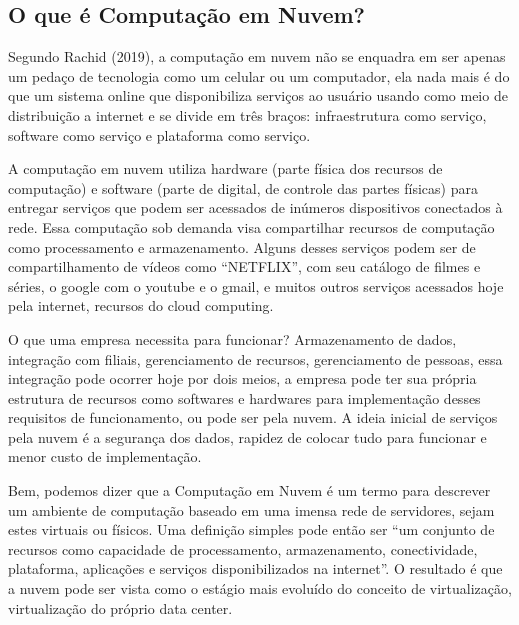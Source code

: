 \begin{justify}
    \section{O que é Computação em Nuvem?}
    Segundo Rachid (2019), a computação em nuvem não se enquadra em ser apenas um
    pedaço de tecnologia como um celular ou um computador, ela nada mais é do que um
    sistema online que disponibiliza serviços ao usuário usando como meio de distribuição a
    internet e se divide em três braços: infraestrutura como serviço, software como serviço e
    plataforma como serviço.

    A computação em nuvem utiliza hardware (parte física dos recursos de computação) e
    software (parte de digital, de controle das partes físicas) para entregar serviços que podem
    ser acessados de inúmeros dispositivos conectados à rede. Essa computação sob demanda
    visa compartilhar recursos de computação como processamento e armazenamento.
    Alguns desses serviços podem ser de compartilhamento de vídeos como
    “NETFLIX”, com seu catálogo de filmes e séries, o google com o youtube e o gmail, e
    muitos outros serviços acessados hoje pela internet, recursos do cloud computing.

    O que uma empresa necessita para funcionar? Armazenamento de dados, integração com
    filiais, gerenciamento de recursos, gerenciamento de pessoas, essa integração pode ocorrer
    hoje por dois meios, a empresa pode ter sua própria estrutura de recursos como softwares e
    hardwares para implementação desses requisitos de funcionamento, ou pode ser pela
    nuvem. A ideia inicial de serviços pela nuvem é a segurança dos dados, rapidez de colocar
    tudo para funcionar e menor custo de implementação.

    \vspace{0.2cm}
    \begin{flushright}
        \begin{minipage}{.7\textwidth}
            \noindent
            \footnotesize

            \begin{justify}
            Bem, podemos dizer que a Computação em Nuvem é um termo para descrever um
            ambiente de computação baseado em uma imensa rede de servidores, sejam estes
            virtuais ou físicos. Uma definição simples pode então ser “um conjunto de recursos
            como capacidade de processamento, armazenamento, conectividade, plataforma,
            aplicações e serviços disponibilizados na internet”. O resultado é que a nuvem pode
            ser vista como o estágio mais evoluído do conceito de virtualização, virtualização do
            próprio data center. \cite{taurion2009cloud}
            \end{justify}
        \end{minipage}
    \end{flushright}
    \vspace{0.2cm}

\end{justify}


